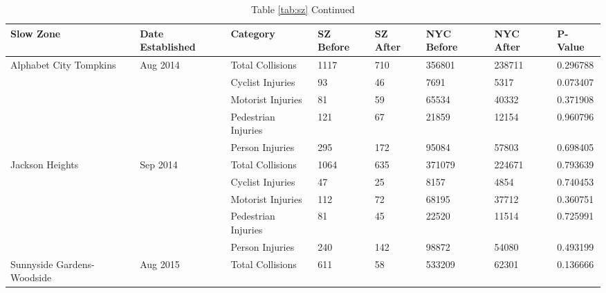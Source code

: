 \documentclass[10pt,journal,compsoc]{IEEEtran}
\begin{document}
\begin{table}[]
\centering
\caption{Table \ref{tab:sz} Continued}
\label{tab:sz2}
\begin{tabular}{|l|l|l|l|l|l|l|l|}
\hline
Slow Zone                                   & Date Established            & Category            & SZ Before & SZ After & NYC Before & NYC After & P-Value  \\ \hline
\multirow{5}{*}{Alphabet City Tompkins}     & \multirow{5}{*}{Aug 2014} & Total Collisions    & 1117      & 710      & 356801     & 238711    & 0.296788 \\ \cline{3-8} 
                                            &                             & Cyclist Injuries    & 93        & 46       & 7691       & 5317      & 0.073407 \\ \cline{3-8} 
                                            &                             & Motorist Injuries   & 81        & 59       & 65534      & 40332     & 0.371908 \\ \cline{3-8} 
                                            &                             & Pedestrian Injuries & 121       & 67       & 21859      & 12154     & 0.960796 \\ \cline{3-8} 
                                            &                             & Person Injuries     & 295       & 172      & 95084      & 57803     & 0.698405 \\ \hline
\multirow{5}{*}{Jackson Heights}            & \multirow{5}{*}{Sep 2014} & Total Collisions    & 1064      & 635      & 371079     & 224671    & 0.793639 \\ \cline{3-8} 
                                            &                             & Cyclist Injuries    & 47        & 25       & 8157       & 4854      & 0.740453 \\ \cline{3-8} 
                                            &                             & Motorist Injuries   & 112       & 72       & 68195      & 37712     & 0.360751 \\ \cline{3-8} 
                                            &                             & Pedestrian Injuries & 81        & 45       & 22520      & 11514     & 0.725991 \\ \cline{3-8} 
                                            &                             & Person Injuries     & 240       & 142      & 98872      & 54080     & 0.493199 \\ \hline
\multirow{5}{*}{Sunnyside Gardens-Woodside} & \multirow{5}{*}{Aug 2015} & Total Collisions    & 611       & 58       & 533209     & 62301     & 0.136666 \\ \cline{3-8} 

\end{tabular}
\end{table}
\end{document}
